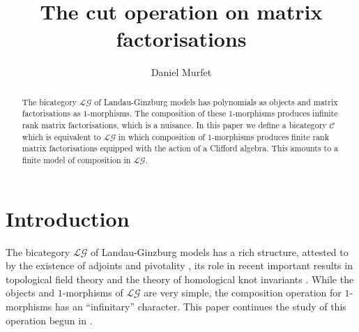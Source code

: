 \documentclass[english,letter paper,12pt,leqno]{article}
\theoremstyle{example}
\numberwithin{equation}{section}
\def\res{\operatorname{Res}}
\def\LG{\mathcal{LG}}
\def\L{\mathcal{C}}
\begin{document}
\def\Res{\res\!}
\newcommand{\ud}{\mathrm{d}}
\newcommand{\Ress}[1]{\res_{#1}\!}
\newcommand{\cat}[1]{\mathcal{#1}}
\newcommand{\lto}{\longrightarrow}
\newcommand{\xlto}[1]{\stackrel{#1}\lto}
\newcommand{\mf}[1]{\mathfrak{#1}}
\newcommand{\md}[1]{\mathscr{#1}}
\def\sus{\l}
\def\l{\,|\,}
\def\sgn{\textup{sgn}}

\title{The cut operation on matrix factorisations}
\author{Daniel Murfet}


\maketitle

\begin{abstract}
The bicategory $\LG$ of Landau-Ginzburg models has polynomials as objects and matrix factorisations as $1$-morphisms. The composition of these $1$-morphisms produces infinite rank matrix factorisations, which is a nuisance. In this paper we define a bicategory $\L$ which is equivalent to $\LG$ in which composition of $1$-morphisms produces finite rank matrix factorisations equipped with the action of a Clifford algebra. This amounts to a finite model of composition in $\LG$.
\end{abstract}

\tableofcontents

\section{Introduction}

The bicategory $\LG$ of Landau-Ginzburg models has a rich structure, attested to by the existence of adjoints and pivotality \cite{lgdual}, its role in recent important results in topological field theory \cite{genorb,ade} and the theory of homological knot invariants \cite{kr0401268}. While the objects and $1$-morphisms of $\LG$ are very simple, the composition operation for $1$-morphisms has an ``infinitary'' character. This paper continues the study of this operation begun in \cite{dm1102.2957}.
\end{document}
